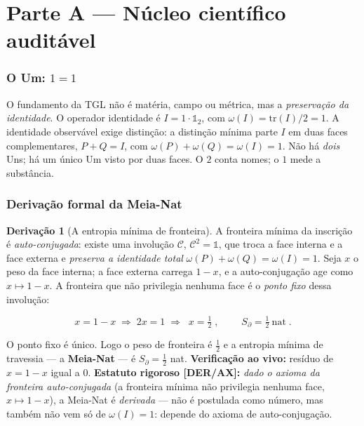 \documentclass[11pt]{article}
\theoremstyle{definition}\newtheorem{deriv}{Derivação}
\begin{document}
\part{Parte A --- Núcleo científico auditável}

\section{O Um: $1=1$}

O fundamento da TGL não é matéria, campo ou métrica, mas a \emph{preservação da identidade}. O operador identidade é $I=1\cdot\mathbb{1}_2$, com $\omega(I)=\mathrm{tr}(I)/2=1$. A identidade observável exige distinção: a distinção mínima parte $I$ em duas faces complementares, $P+Q=I$, com $\omega(P)+\omega(Q)=\omega(I)=1$. Não há \emph{dois} Uns; há um único Um visto por duas faces. O $2$ conta nomes; o $1$ mede a substância.

\section{Derivação formal da Meia-Nat}

\begin{deriv}[A entropia mínima de fronteira]

A fronteira mínima da inscrição é \emph{auto-conjugada}: existe uma involução $\mathcal{C}$, $\mathcal{C}^2=\mathbb{1}$, que troca a face interna e a face externa e \emph{preserva a identidade total} $\omega(P)+\omega(Q)=\omega(I)=1$. Seja $x$ o peso da face interna; a face externa carrega $1-x$, e a auto-conjugação age como $x\mapsto 1-x$. A fronteira que não privilegia nenhuma face é o \emph{ponto fixo} dessa involução:

\begin{equation}x=1-x\;\Longrightarrow\;2x=1\;\Longrightarrow\;\boxed{\;x=\tfrac12\;},\qquad\boxed{\;S_\partial=\tfrac12\ \text{nat}\;}.\end{equation}

O ponto fixo é único. Logo o peso de fronteira é $\tfrac12$ e a entropia mínima de travessia --- a \textbf{Meia-Nat} --- é $S_\partial=\tfrac12$ nat. \textbf{Verificação ao vivo:} resíduo de $x=1-x$ igual a $0$. \textbf{Estatuto rigoroso \textsf{[DER/AX]}:} \emph{dado o axioma da fronteira auto-conjugada} (a fronteira mínima não privilegia nenhuma face, $x\mapsto1-x$), a Meia-Nat é \emph{derivada} --- não é postulada como número, mas também não vem só de $\omega(I)=1$: depende do axioma de auto-conjugação.\end{deriv}
\end{document}
